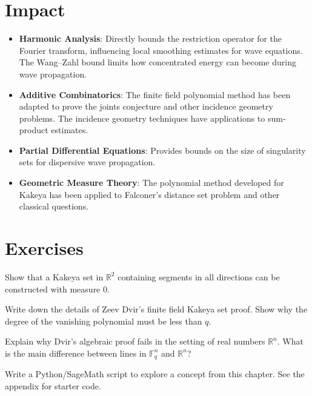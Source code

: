 \section{Impact}
\begin{itemize}
\item \textbf{Harmonic Analysis}: Directly bounds the restriction operator for the Fourier transform, influencing local smoothing estimates for wave equations. The Wang--Zahl bound limits how concentrated energy can become during wave propagation.
\item \textbf{Additive Combinatorics}: The finite field polynomial method has been adapted to prove the joints conjecture and other incidence geometry problems. The incidence geometry techniques have applications to sum-product estimates.
\item \textbf{Partial Differential Equations}: Provides bounds on the size of singularity sets for dispersive wave propagation.
\item \textbf{Geometric Measure Theory}: The polynomial method developed for Kakeya has been applied to Falconer's distance set problem and other classical questions.
\end{itemize}

\section{Exercises}

\begin{exercise}[Basic]
Show that a Kakeya set in $\mathbb{R}^2$ containing segments in all directions can be constructed with measure 0.
\end{exercise}

\begin{exercise}[Intermediate]
Write down the details of Zeev Dvir's finite field Kakeya set proof. Show why the degree of the vanishing polynomial must be less than $q$.
\end{exercise}

\begin{exercise}[Challenge]
Explain why Dvir's algebraic proof fails in the setting of real numbers $\mathbb{R}^n$. What is the main difference between lines in $\mathbb{F}_q^n$ and $\mathbb{R}^n$?
\end{exercise}

\begin{exercise}[Computational]
Write a Python/SageMath script to explore a concept from this chapter. See the appendix for starter code.
\end{exercise}

